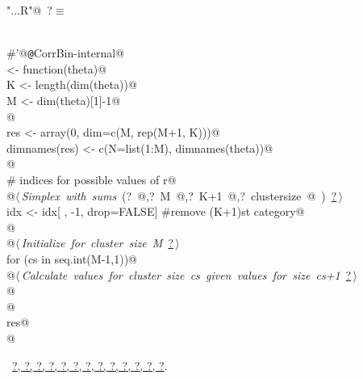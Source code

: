\documentclass[reqno]{amsart}
\renewcommand{\NWtarget}[2]{\hypertarget{#1}{#2}}
\renewcommand{\NWlink}[2]{\hyperlink{#1}{#2}}
\begin{document}
\begin{flushleft} \small\label{scrap20}\raggedright\small
\NWtarget{nuweb?}{} \verb@"..\R\ExchMultinomial.R"@\nobreak\ {\footnotesize {?}}$\equiv$
\vspace{-1ex}
\begin{list}{}{} \item
\mbox{}\verb@@\\
\mbox{}\verb@#'@{\tt @}\verb@rdname CorrBin-internal@\\
\mbox{}\verb@Marginals <- function(theta){@\\
\mbox{}\verb@  K <- length(dim(theta))@\\
\mbox{}\verb@  M <- dim(theta)[1]-1@\\
\mbox{}\verb@  @\\
\mbox{}\verb@  res <- array(0, dim=c(M, rep(M+1, K)))@\\
\mbox{}\verb@  dimnames(res) <- c(N=list(1:M), dimnames(theta))@\\
\mbox{}\verb@  @\\
\mbox{}\verb@  # indices for possible values of r@\\
\mbox{}\verb@  @\hbox{$\langle\,${\itshape Simplex with sums}\nobreak\ ({\footnotesize ?\label{scrap21}
 }\mbox{}\verb@idx @,{\footnotesize ?\label{scrap22}
 }\mbox{}\verb@ M @,{\footnotesize ?\label{scrap23}
 }\mbox{}\verb@ K+1 @,{\footnotesize ?\label{scrap24}
 }\mbox{}\verb@ clustersize @ ) {\footnotesize \NWlink{nuweb?}{?}}$\,\rangle$}\verb@@\\
\mbox{}\verb@  idx <- idx[ , -1, drop=FALSE]  #remove (K+1)st category@\\
\mbox{}\verb@  @\\
\mbox{}\verb@  @\hbox{$\langle\,${\itshape Initialize for cluster size M}\nobreak\ {\footnotesize \NWlink{nuweb?}{?}}$\,\rangle$}\verb@@\\
\mbox{}\verb@  for (cs in seq.int(M-1,1)){@\\
\mbox{}\verb@    @\hbox{$\langle\,${\itshape Calculate values for cluster size cs given values for size cs+1}\nobreak\ {\footnotesize \NWlink{nuweb?}{?}}$\,\rangle$}\verb@@\\
\mbox{}\verb@  }@\\
\mbox{}\verb@  @\\
\mbox{}\verb@  res@\\
\mbox{}\verb@}@\\
\mbox{}\verb@@{\NWsep}
\end{list}
\vspace{-1.5ex}
\footnotesize
\begin{list}{}{\setlength{\itemsep}{-\parsep}\setlength{\itemindent}{-\leftmargin}}
\item \NWtxtFileDefBy\ \NWlink{nuweb?}{?}\NWlink{nuweb?}{, ?}\NWlink{nuweb?}{, ?}\NWlink{nuweb?}{, ?}\NWlink{nuweb?}{, ?}\NWlink{nuweb?}{, ?}\NWlink{nuweb?}{, ?}\NWlink{nuweb?}{, ?}\NWlink{nuweb?}{, ?}\NWlink{nuweb?}{, ?}\NWlink{nuweb?}{, ?}\NWlink{nuweb?}{, ?}\NWlink{nuweb?}{, ?}.

\item{}
\end{list}
\vspace{4ex}
\end{flushleft}
\end{document}
